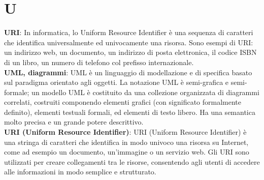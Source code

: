 \section{U}
\textbf{URI}: In informatica, lo Uniform Resource Identifier è una sequenza di caratteri che identifica universalmente ed univocamente una risorsa. Sono esempi di URI: un indirizzo web, un documento, un indirizzo di posta elettronica, il codice ISBN di un libro, un numero di telefono col prefisso internazionale.\\
\textbf{UML, diagrammi}: UML è un linguaggio di modellazione e di specifica basato sul paradigma orientato agli oggetti.
 La notazione UML è semi-grafica e semi-formale; un modello UML è costituito da una collezione organizzata di diagrammi correlati, costruiti componendo elementi grafici (con significato
formalmente definito), elementi testuali formali, ed elementi di testo libero. Ha una semantica molto
precisa e un grande potere descrittivo.\\
\textbf{URI (Uniform Resource Identifier)}: URI (Uniform Resource Identifier) è una stringa di caratteri che identifica in modo univoco una risorsa su Internet, come ad esempio un documento, un'immagine o un servizio web. Gli URI sono utilizzati per creare collegamenti tra le risorse, consentendo agli utenti di accedere alle informazioni in modo semplice e strutturato.